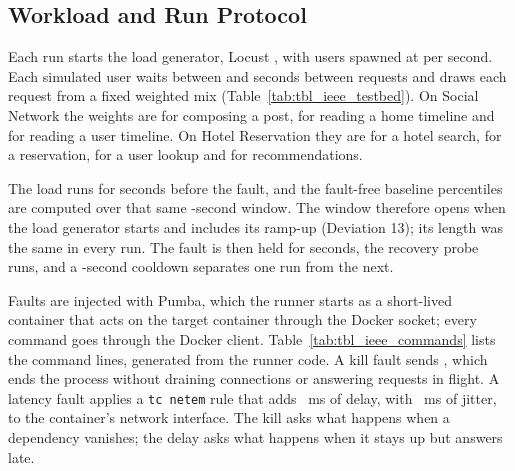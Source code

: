 \subsection{Workload and Run Protocol}
\label{sec:protocol}

Each run starts the load generator, Locust , with
 users spawned at  per second. Each simulated
user waits between  and  seconds
between requests %
and draws each request from a fixed weighted mix (Table~\ref{tab:tbl_ieee_testbed}). On
Social Network the weights are  for composing a post,
 for reading a home timeline and
 for reading a user timeline. On Hotel
Reservation they are  for a hotel search,
 for a reservation,
 for a user lookup and
 for recommendations.

The load runs for  seconds before the fault, and the fault-free baseline
percentiles are computed over that same -second window. The
window therefore opens when the load generator starts and includes its ramp-up (Deviation 13);
its length was the same in every run. %
The fault is then held for  seconds, the recovery probe runs,
and a -second cooldown separates one run from the next.

Faults are injected with Pumba, which the runner starts as a short-lived container that acts on
the target container through the Docker socket; every command goes through the Docker
 client. Table~\ref{tab:tbl_ieee_commands} lists the command lines,
generated from the runner code. A kill fault sends , which ends the
process without draining connections or answering requests in flight. A latency fault applies
a \texttt{tc netem} rule that adds ~ms of delay, with
~ms of jitter, to the container's network interface. The kill asks
what happens when a dependency vanishes; the delay asks what happens when it stays up but
answers late.

